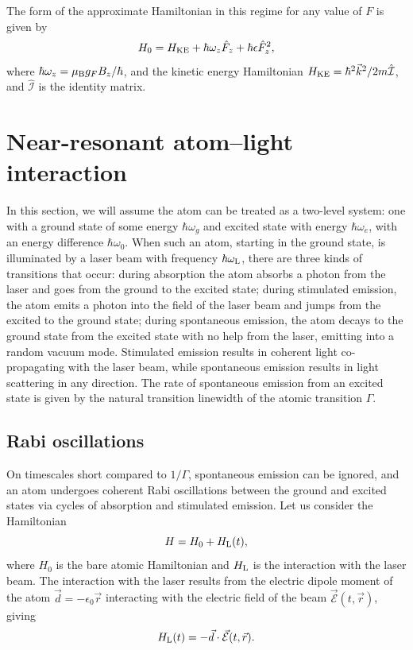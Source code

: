 The form of the approximate Hamiltonian in this regime for any value of $F$ is given by
\begin{equation}
H_0 = H_{\rm KE} + \hbar \omega_z \hat{F}_z + \hbar\epsilon \hat{F}_z^2,
\end{equation}
where $\hbar \omega_z = \mu_{\rm B} g_F B_z/\hbar$, and the kinetic energy Hamiltonian $H_{\rm KE} = \hbar^2 \vec{k}^2/2m \hat{\mathcal{I}}$, and $\hat{\mathcal{I}}$ is the identity matrix.

\section{Near-resonant atom--light interaction}\label{sec:NRatomLight}

In this section, we will assume the atom can be treated as a two-level system: one with a ground state of some energy $\hbar\omega_g$ and excited state with energy $\hbar\omega_e$, with an energy difference $\hbar\omega_0$. When such an atom, starting in the ground state, is illuminated by a laser beam with frequency $\hbar\omega_{\rm{L}}$, there are three kinds of transitions that occur: during absorption the atom absorbs a photon from the laser and goes from the ground to the excited state; during stimulated emission, the atom emits a photon into the field of the laser beam and jumps from the excited to the ground state; during spontaneous emission, the atom decays to the ground state from the excited state with no help from the laser, emitting into a random vacuum mode. Stimulated emission results in coherent light co-propagating with the laser beam, while spontaneous emission results in light scattering in any direction. The rate of spontaneous emission from an excited state is given by the natural transition linewidth of the atomic transition $\Gamma$. 

\subsection{Rabi oscillations}\label{sec:Rabi}

On timescales short compared to $1/\Gamma$, spontaneous emission can be ignored, and an atom undergoes coherent Rabi oscillations between the ground and excited states via cycles of absorption and stimulated emission\cite{LCT}.  Let us consider the Hamiltonian 
\begin{equation}
H=H_0 + H_{\rm L}(t),
\end{equation}
where $H_0$ is the bare atomic Hamiltonian and $H_{\rm L}$ is the interaction with the laser beam. The interaction with the laser results from the electric dipole moment of the atom $\vec{d}=-\epsilon_0\vec{r}$ interacting with the electric field of the beam $\vec{\mathcal{E}}(t,\vec{r})$, giving
\begin{equation}
H_{\rm L}(t) = -\vec{d}\cdot\vec{\mathcal{E}}(t,\vec{r}).
\end{equation}

